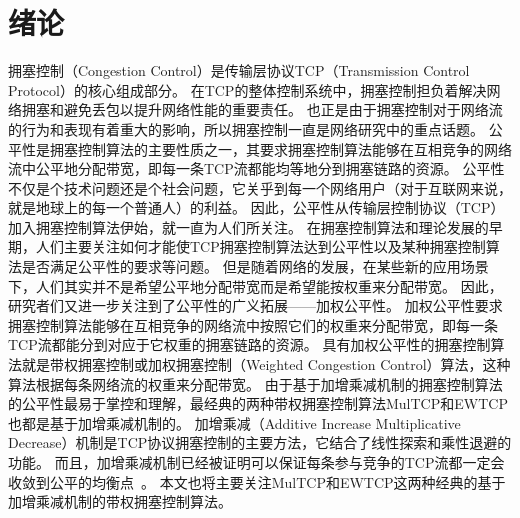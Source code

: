 \documentclass[winfonts]{njuthesis}
\begin{document}
\tableofcontents



\mainmatter

\chapter{绪论}\label{chapter:intro}

拥塞控制（Congestion Control）是传输层协议TCP（Transmission Control Protocol）的核心组成部分。
在TCP的整体控制系统中，拥塞控制担负着解决网络拥塞和避免丢包以提升网络性能的重要责任\cite{jacobson1988congestion}。
也正是由于拥塞控制对于网络流的行为和表现有着重大的影响，所以拥塞控制一直是网络研究中的重点话题。
公平性是拥塞控制算法的主要性质之一，其要求拥塞控制算法能够在互相竞争的网络流中公平地分配带宽，即每一条TCP流都能均等地分到拥塞链路的资源。
公平性不仅是个技术问题还是个社会问题，它关乎到每一个网络用户（对于互联网来说，就是地球上的每一个普通人）的利益。
因此，公平性从传输层控制协议（TCP）加入拥塞控制算法伊始，就一直为人们所关注。
在拥塞控制算法和理论发展的早期，人们主要关注如何才能使TCP拥塞控制算法达到公平性以及某种拥塞控制算法是否满足公平性的要求等问题\cite{chiu1989analysis}\cite{kelly1998rate}\cite{hasegawa1999fairness}。
但是随着网络的发展，在某些新的应用场景\cite{wischik2011design}\cite{popa2012faircloud}\cite{Nathan2019wcubic}下，人们其实并不是希望公平地分配带宽而是希望能按权重来分配带宽。
因此，研究者们又进一步关注到了公平性的广义拓展——加权公平性。
加权公平性要求拥塞控制算法能够在互相竞争的网络流中按照它们的权重来分配带宽，即每一条TCP流都能分到对应于它权重的拥塞链路的资源。
具有加权公平性的拥塞控制算法就是带权拥塞控制或加权拥塞控制（Weighted Congestion Control）算法，这种算法根据每条网络流的权重来分配带宽。
由于基于加增乘减机制的拥塞控制算法的公平性最易于掌控和理解，最经典的两种带权拥塞控制算法MulTCP\cite{crowcroft1998differentiated}和EWTCP\cite{Honda2009EWTCP,wischik2011design}也都是基于加增乘减机制的。
加增乘减（Additive Increase Multiplicative Decrease）机制是TCP协议拥塞控制的主要方法，它结合了线性探索和乘性退避的功能。
而且，加增乘减机制已经被证明可以保证每条参与竞争的TCP流都一定会收敛到公平的均衡点~\cite{chiu1989analysis}。
本文也将主要关注MulTCP和EWTCP这两种经典的基于加增乘减机制的带权拥塞控制算法。
\end{document}
